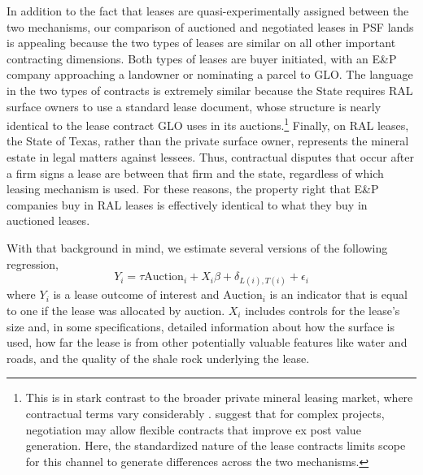 \documentclass[12pt]{article}
\begin{document}
In addition to the fact that leases are quasi-experimentally assigned between the two mechanisms, our comparison of auctioned and negotiated leases in PSF lands is appealing because the two types of leases are similar on all other important contracting dimensions. Both types of leases are buyer initiated, with an E\&P company approaching a landowner or nominating a parcel to GLO. The language in the two types of contracts is extremely similar because the State requires RAL surface owners to use a standard lease document, whose structure is nearly identical to the lease contract GLO uses in its auctions.\footnote{This is in stark contrast to the broader private mineral leasing market, where contractual terms vary considerably \citep{timmins2017environmental}. \citet{bajari_auctions_2009} suggest that for complex projects, negotiation may allow flexible contracts that improve ex post value generation. Here, the standardized nature of the lease contracts limits scope for this channel to generate differences across the two mechanisms.} Finally, on RAL leases, the State of Texas, rather than the private surface owner, represents the mineral estate in legal matters against lessees.  Thus, contractual disputes that occur after a firm signs a lease are between that firm and the state, regardless of which leasing mechanism is used. For these reasons, the property right that E\&P companies buy in RAL leases is effectively identical to what they buy in auctioned leases. 

With that background in mind, we estimate several versions of the following regression,
\begin{equation}
 	Y_i = \tau \text{Auction}_i + X_i \beta + \delta_{L(i),T(i)} + \epsilon_i \label{eq:mainAuction}
\end{equation}
where $Y_i$ is a lease outcome of interest and $\text{Auction}_i$ is an indicator that is equal to one if the lease was allocated by auction. $X_i$ includes controls for the lease's size and, in some specifications, detailed information about how the surface is used, how far the lease is from other potentially valuable features like water and roads, and the quality of the shale rock underlying the lease. 
\end{document}
